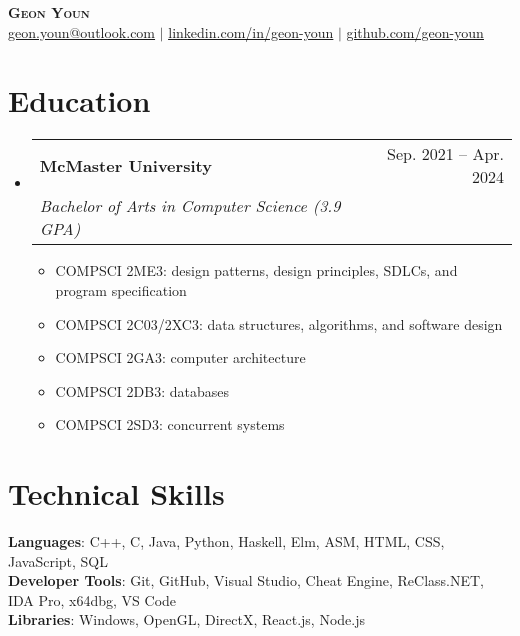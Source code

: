 \documentclass[letterpaper,11pt]{article}
\makeatletter
\newcommand{\resumeItem}[1]{
  \item\small{
    {#1 \vspace{-2pt}}
  }
}
\newcommand{\resumeSubheading}[4]{
  \vspace{-2pt}\item
    \begin{tabular*}{0.97\textwidth}[t]{l@{\extracolsep{\fill}}r}
      \textbf{#1} & #2 \\
      \textit{\small#3} & \textit{\small #4} \\
    \end{tabular*}\vspace{-7pt}
}
\newcommand{\resumeSubHeadingListStart}{\begin{itemize}[leftmargin=0.15in, label={}]}
\newcommand{\resumeSubHeadingListEnd}{\end{itemize}}
\newcommand{\resumeItemListStart}{\begin{itemize}}
\newcommand{\resumeItemListEnd}{\end{itemize}\vspace{-5pt}}
\makeatother
\begin{document}
\begin{center}
	\textbf{\Huge \scshape Geon Youn} \\ \vspace{1pt}
	\small \href{mailto:geon.youn@outlook.com}{\underline{geon.youn@outlook.com}} $|$ 
	\href{https://linkedin.com/in/geon-youn}{\underline{linkedin.com/in/geon-youn}} $|$
	\href{https://github.com/geon-youn}{\underline{github.com/geon-youn}}
\end{center}

\section{Education}
\resumeSubHeadingListStart
	\resumeSubheading
		{McMaster University}{Sep. 2021 -- Apr. 2024}
		{Bachelor of Arts in Computer Science (3.9 GPA)}{}
	\resumeItemListStart
		\resumeItem{COMPSCI 2ME3: design patterns, design principles, SDLCs, and program specification}
		\resumeItem{COMPSCI 2C03/2XC3: data structures, algorithms, and software design}
		\resumeItem{COMPSCI 2GA3: computer architecture}
		\resumeItem{COMPSCI 2DB3: databases}
		\resumeItem{COMPSCI 2SD3: concurrent systems}
	\resumeItemListEnd
\resumeSubHeadingListEnd
  
\section{Technical Skills}
\begin{itemize}[leftmargin=0.15in, label={}]
	\small{\item{
		\textbf{Languages}{: C++, C, Java, Python, Haskell, Elm, ASM, HTML, CSS, JavaScript, SQL} \\
		\textbf{Developer Tools}{: Git, GitHub, Visual Studio, Cheat Engine, ReClass.NET, IDA Pro, x64dbg, VS Code} \\
		\textbf{Libraries}{: Windows, OpenGL, DirectX, React.js, Node.js}
    }}
\end{itemize}

%
      
\end{document}
